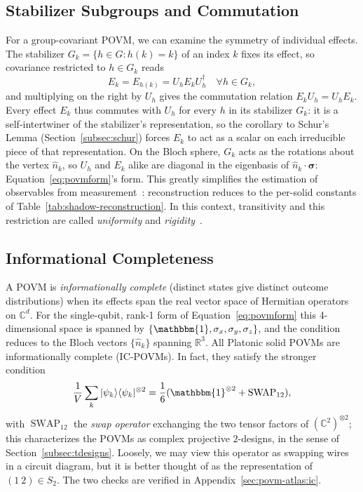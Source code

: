 \documentclass[11pt, oneside, openany]{scrbook}
\newcommand{\C}{\mathbb{C}}
\newcommand{\R}{\mathbb{R}}
\newcommand{\Id}{\mathbbm{1}}
\newcommand{\sigmavec}{\boldsymbol{\sigma}}
\newcommand{\ket}[1]{|#1\rangle}
\newcommand{\bra}[1]{\langle#1|}
\begin{document}
\subsection{Stabilizer Subgroups and Commutation}

For a group-covariant POVM, we can examine the symmetry of individual effects. The stabilizer $G_k = \{ h \in G : h(k) = k \}$ of an index $k$ fixes its effect, so covariance restricted to $h \in G_k$ reads
$$ E_k = E_{h(k)} = U_h E_k U_h^\dagger \quad \forall h \in G_k, $$
and multiplying on the right by $U_h$ gives the commutation relation $E_k U_h = U_h E_k$. Every effect $E_k$ thus commutes with $U_h$ for every $h$ in its stabilizer $G_k$: it is a self-intertwiner of the stabilizer's representation, so the corollary to Schur's Lemma (Section~\ref{subsec:schur}) forces $E_k$ to act as a scalar on each irreducible piece of that representation. On the Bloch sphere, $G_k$ acts as the rotations about the vertex $\hat n_k$, so $U_h$ and $E_k$ alike are diagonal in the eigenbasis of $\hat n_k \cdot \sigmavec$: Equation~\eqref{eq:povmform}'s form. This greatly simplifies the estimation of observables from measurement~\cite{nguyen2022optimisingshadowtomography}: reconstruction reduces to the per-solid constants of Table~\ref{tab:shadow-reconstruction}. In this context, transitivity and this restriction are called \textit{uniformity} and \textit{rigidity}~\cite{nguyen2020symmetriesmeasurementsquantum}.

\subsection{Informational Completeness}

A POVM is \textit{informationally complete} (distinct states give distinct outcome distributions) when its effects span the real vector space of Hermitian operators on $\C^d$. For the single-qubit, rank-1 form of Equation~\eqref{eq:povmform} this 4-dimensional space is spanned by $\{\Id, \sigma_x, \sigma_y, \sigma_z\}$, and the condition reduces to the Bloch vectors $\{\hat n_k\}$ spanning $\R^3$. All Platonic solid POVMs are informationally complete (IC-POVMs). In fact, they satisfy the stronger condition
$$ \frac{1}{V} \sum_k \ket{\psi_k}\bra{\psi_k}^{\otimes 2} = \frac{1}{6} (\Id^{\otimes 2} + \operatorname{SWAP}_{12}),$$
with $\operatorname{SWAP}_{12}$ the \textit{swap operator} exchanging the two tensor factors of $(\C^2)^{\otimes 2}$; this characterizes the POVMs as complex projective $2$-designs, in the sense of Section~\ref{subsec:tdesigns}. Loosely, we may view this operator as swapping wires in a circuit diagram, but it is better thought of as the representation of $(1\ 2) \in S_2$. The two checks are verified in Appendix~\ref{sec:povm-atlas:ic}.
\end{document}
